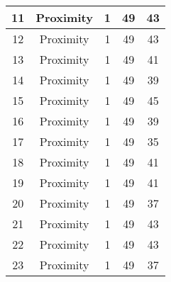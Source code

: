 \documentclass[results.tex]{subfiles}
\begin{document}
\begin{center}
\begin{tabular}{| c || c | c | c | c |}
            \hline
            11                      & Proximity                    & 1                      & 49                      & 43                   \\
            \hline
            12                      & Proximity                    & 1                      & 49                      & 43                   \\
            \hline
            13                      & Proximity                    & 1                      & 49                      & 41                   \\
            \hline
            14                      & Proximity                    & 1                      & 49                      & 39                   \\
            \hline
            15                      & Proximity                    & 1                      & 49                      & 45                   \\
            \hline
            16                      & Proximity                    & 1                      & 49                      & 39                   \\
            \hline
            17                      & Proximity                    & 1                      & 49                      & 35                   \\
            \hline
            18                      & Proximity                    & 1                      & 49                      & 41                   \\
            \hline
            19                      & Proximity                    & 1                      & 49                      & 41                   \\
            \hline
            20                      & Proximity                    & 1                      & 49                      & 37                   \\
            \hline
            21                      & Proximity                    & 1                      & 49                      & 43                   \\
            \hline
            22                      & Proximity                    & 1                      & 49                      & 43                   \\
            \hline
            23                      & Proximity                    & 1                      & 49                      & 37                   \\

\end{tabular}
\end{center}
\end{document}

